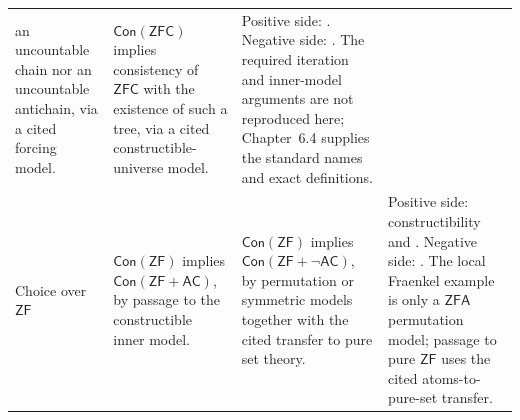 \begin{landscape}
\begin{longtable}{@{}p{.85in}p{1.95in}p{2.10in}p{2.10in}@{}}
  an uncountable chain nor an uncountable antichain, via a cited forcing model.
& \(\mathsf{Con}(\mathsf{ZFC})\) implies consistency of \(\mathsf{ZFC}\) with
  the existence of such a tree, via a cited constructible-universe model.
& Positive side: \textcite{MartinSolovay1970,Jech2003}.  Negative side:
  \textcite{Jensen1972FineStructure}.  The required iteration and inner-model
  arguments are not reproduced here; Chapter~6.4 supplies the standard names
  and exact definitions. \\
\addlinespace
Choice over \(\mathsf{ZF}\)
& \(\mathsf{Con}(\mathsf{ZF})\) implies
  \(\mathsf{Con}(\mathsf{ZF}+\mathsf{AC})\), by passage to the
  constructible inner model.
& \(\mathsf{Con}(\mathsf{ZF})\) implies
  \(\mathsf{Con}(\mathsf{ZF}+\neg\mathsf{AC})\), by permutation or
  symmetric models together with the cited transfer to pure set theory.
& Positive side: constructibility and \textcite{Godel1938}.  Negative side:
  \textcite{Jech1973Choice,Halbeisen2017}.  The local Fraenkel example is only
  a \(\mathsf{ZFA}\) permutation model; passage to pure \(\mathsf{ZF}\) uses
  the cited atoms-to-pure-set transfer. \\
\bottomrule
\end{longtable}
\end{landscape}
